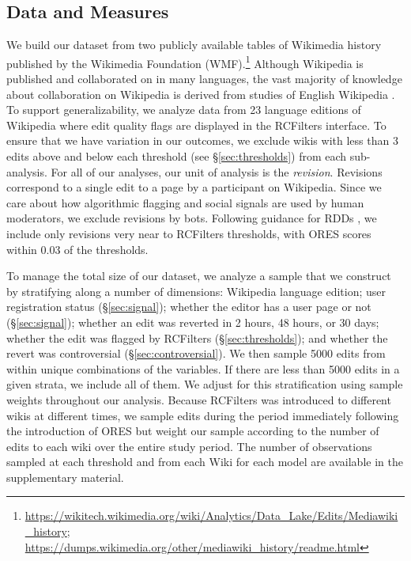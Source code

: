 \documentclass[format=acmsmall, natbib=true,  screen=true]{acmart}
\begin{document}
\subsection{Data and Measures}

We build our dataset from two publicly available tables of Wikimedia history published by the Wikimedia Foundation (WMF).\footnote{\url{https://wikitech.wikimedia.org/wiki/Analytics/Data\_Lake/Edits/Mediawiki\_history}; \url{https://dumps.wikimedia.org/other/mediawiki\_history/readme.html}}
Although Wikipedia is published and collaborated on in many languages, the vast majority of knowledge about collaboration on Wikipedia is derived from studies of English Wikipedia \cite{hecht_tower_2010, hara_cross-cultural_2010}.  To support generalizability, we analyze data from  23 language editions of Wikipedia where edit quality flags are displayed in the RCFilters interface.
To ensure that we have variation in our outcomes, we exclude wikis with less than 3 edits above and below each threshold (see §\ref{sec:thresholds}) from each sub-analysis.
For all of our analyses, our unit of analysis is the \emph{revision}. Revisions correspond to a single edit to a page by a participant on Wikipedia.  Since we care about how algorithmic flagging and social signals are used by human moderators, we exclude revisions by bots.
Following guidance for RDDs \citep{lee_regression_2010}, we include only revisions very near to RCFilters thresholds, with ORES scores within 0.03 of the thresholds. 



To manage the total size of our dataset, we analyze a sample that we construct by stratifying along a number of dimensions: Wikipedia language edition; user registration status (§\ref{sec:signal}); whether the editor has a user page or not (§\ref{sec:signal}); whether an edit was reverted in 2 hours, 48 hours, or 30 days; whether the edit was flagged by RCFilters (§\ref{sec:thresholds}); and whether the revert was controversial (§\ref{sec:controversial}).
We then sample 5000 edits from within unique combinations of the variables. If there are less than  5000 edits in a given strata, we include all of them.
We adjust for this stratification using sample weights throughout our analysis.
Because RCFilters was introduced to different wikis at different times,
we sample edits during the period immediately following the introduction of ORES but weight our sample according to the number of edits to each wiki over the entire study period. 
The number of observations sampled at each threshold and from each Wiki for each model are available in the supplementary material. 
\end{document}
